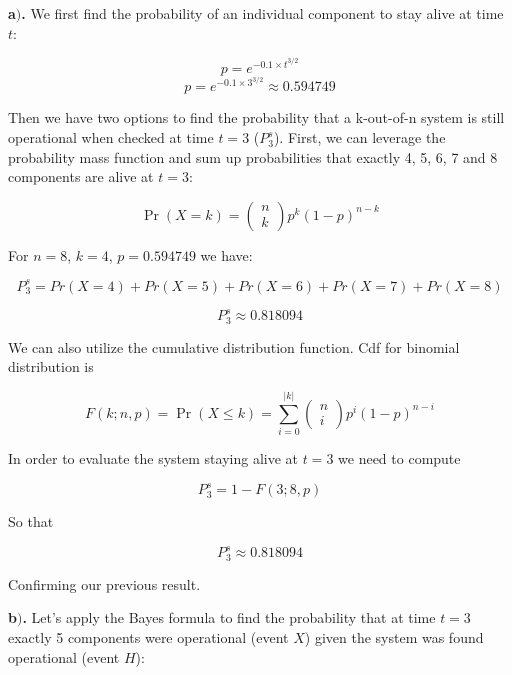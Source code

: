 \documentclass[a4 paper]{article}
\begin{document}
	







\textbf{a$)$.} We first find the probability 
of an individual component to stay alive at time $t$:

$$
p=e^{-0.1 \times t^{3 / 2}}
$$
$$
p=e^{-0.1 \times 3^{3 / 2}} \approx 0.594749
$$

Then we have two options to find the probability 
that a k-out-of-n system is still operational when 
checked at
time $t=3$ ($P^s_3$). First, we can leverage the probability 
mass function and sum up probabilities that 
exactly 4, 5, 6, 7 and 8 components are alive at $t=3$:

$$
\operatorname{Pr}(X=k)=\left(\begin{array}{l}
{n} \\
{k}
\end{array}\right) p^{k}(1-p)^{n-k}
$$

For $n=8$, $k=4$, $p=0.594749$ we have:

$$
P_{3}^{s}=Pr(X=4)+Pr(X=5)+Pr(X=6)+Pr(X=7)+Pr(X=8)
$$

$$
P_{3}^{s} \approx 0.818094
$$


We can also utilize the cumulative
distribution function. Cdf for binomial distribution is 

$$
F(k ; n, p)=\operatorname{Pr}(X \leq k)=\sum_{i=0}^{|k|}\left(\begin{array}{l}
{n} \\
{i}
\end{array}\right) p^{i}(1-p)^{n-i}
$$

In order to evaluate the system staying alive at $t=3$ 
we need to compute 

$$
P_{3}^{s} = 1 - F(3; 8, p)
$$

So that 

$$
P_{3}^{s} \approx 0.818094
$$

Confirming our previous result. \newline



\textbf{b$)$.} Let's apply the Bayes formula to find
the probability that at time $t=3$ exactly 5 components 
were operational (event $X$) given the system was found 
operational (event $H$):
\end{document}
